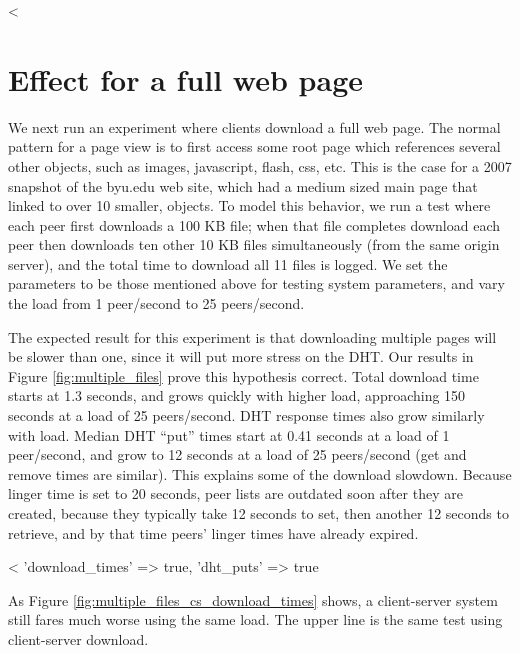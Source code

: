 
<%

\section{Effect for a full web page}

We next run an experiment where clients download a full web page.  The normal pattern for a page view 
is to first access some root page which references several other objects, such as images, 
javascript, flash, css, etc. This is the case for a 2007 snapshot of the byu.edu web site, which had a medium sized main page that 
linked to over 10 smaller, objects.  To model this behavior, we run a test where each peer first 
downloads a 100 KB file; when that file completes download each peer then downloads ten other 10 KB files simultaneously 
(from the same origin server), and the total time to download all 11 files is logged. We set the parameters 
to be those mentioned above for testing system parameters, and vary the load from 1 peer/second to 25 peers/second. 

The expected result for this experiment is that downloading multiple pages will be slower than one, 
since it will put more stress on the DHT.  Our results in Figure \ref{fig:multiple_files} prove
this hypothesis correct.  Total download time starts at 1.3 seconds, and grows quickly with higher load, approaching 
150 seconds at a load of 25 peers/second. DHT response times also grow similarly with load.  Median DHT ``put'' times start 
at 0.41 seconds at a load of 1 peer/second, and grow to 12 seconds at a load of 25 peers/second (get and remove times are similar).
This explains some of the download slowdown.  Because linger time is set to 20 seconds, peer lists are outdated soon after they are created, because
they typically take 12 seconds to set, then another 12 seconds to retrieve, and by that time peers' linger times have already expired.


<%
   {'download_times' => true, 'dht_puts' => true} %

As Figure \ref{fig:multiple_files_cs_download_times} shows, a client-server system still fares much worse using the same load.  The upper line is the same test using client-server download.

